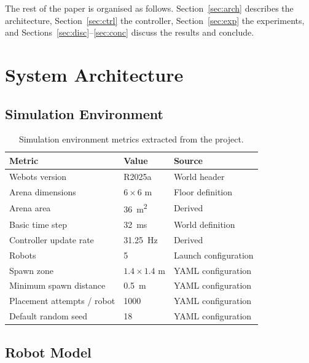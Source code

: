 \documentclass[conference]{IEEEtran}
\begin{document}
The rest of the paper is organised as follows. Section~\ref{sec:arch}
describes the architecture, Section~\ref{sec:ctrl} the controller,
Section~\ref{sec:exp} the experiments, and
Sections~\ref{sec:disc}--\ref{sec:conc} discuss the results and
conclude.

\section{System Architecture}

\subsection{Simulation Environment}

\begin{table}[t]
    \centering
    \caption{Simulation environment metrics extracted from the project.}
    \label{tab:environment}
    \begin{tabular}{lll}
        \toprule
        Metric & Value & Source \\
        \midrule
        Webots version & R2025a & World header \\
        Arena dimensions & $6 \times 6$ m & Floor definition \\
        Arena area & \SI{36}{m^2} & Derived \\
        Basic time step & \SI{32}{ms} & World definition \\
        Controller update rate & \SI{31.25}{Hz} & Derived \\
        Robots & 5 & Launch configuration \\
        Spawn zone & $1.4 \times 1.4$ m & YAML configuration \\
        Minimum spawn distance & \SI{0.5}{m} & YAML configuration \\
        Placement attempts / robot & 1000 & YAML configuration \\
        Default random seed & 18 & YAML configuration \\
        \bottomrule
    \end{tabular}
\end{table}

\subsection{Robot Model}
\end{document}
